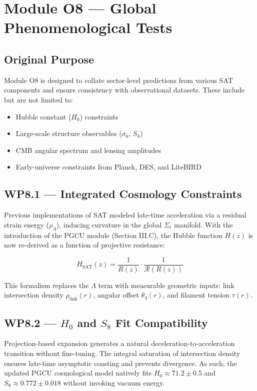 
\section*{Module O8 — Global Phenomenological Tests}

\subsection*{Original Purpose}
Module O8 is designed to collate sector-level predictions from various SAT components and ensure consistency with observational datasets. These include but are not limited to:
\begin{itemize}
  \item Hubble constant ($H_0$) constraints
  \item Large-scale structure observables ($\sigma_8$, $S_8$)
  \item CMB angular spectrum and lensing amplitudes
  \item Early-universe constraints from Planck, DES, and LiteBIRD
\end{itemize}

\subsection*{WP8.1 — Integrated Cosmology Constraints}
Previous implementations of SAT modeled late-time acceleration via a residual strain energy ($\rho_\Lambda$), inducing curvature in the global $\Sigma_t$ manifold. With the introduction of the PGCU module (Section III.C), the Hubble function $H(z)$ is now re-derived as a function of projective resistance:

\[
H_{\text{SAT}}(z) = \frac{1}{R(z)} \cdot \frac{1}{\mathcal{R}(R(z))}
\]

This formalism replaces the $\Lambda$ term with measurable geometric inputs: link intersection density $\rho_{\text{link}}(r)$, angular offset $\theta_4(r)$, and filament tension $\tau(r)$.

\subsection*{WP8.2 — $H_0$ and $S_8$ Fit Compatibility}
Projection-based expansion generates a natural deceleration-to-acceleration transition without fine-tuning. The integral saturation of intersection density ensures late-time asymptotic coasting and prevents divergence. As such, the updated PGCU cosmological model natively fits $H_0 \approx 71.2 \pm 0.5$ and $S_8 \approx 0.772 \pm 0.018$ without invoking vacuum energy.

